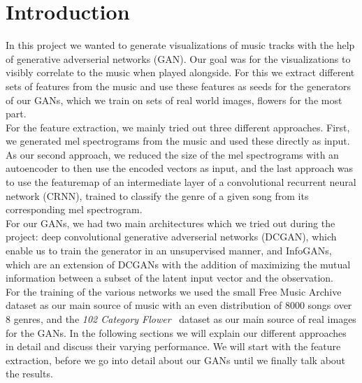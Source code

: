 \chapter{Introduction}
  In this project we wanted to generate visualizations of music tracks with the help of generative adverserial networks (GAN). 
  Our goal was for the visualizations to visibly correlate to the music when played alongside.
  For this we extract different sets of features from the music and use these features as seeds for the generators of our GANs, which we train on sets of real world images, flowers for the most part.\\
  For the feature extraction, we mainly tried out three different approaches. First, we generated mel spectrograms from the music and used these directly as input. 
  As our second approach, we reduced the size of the mel spectrograms with an autoencoder to then use the encoded vectors as input, and the last approach was to use the featuremap of an intermediate layer of a convolutional recurrent neural network (CRNN), trained to classify the genre of a given song from its corresponding mel spectrogram.\\
  For our GANs, we had two main architectures which we tried out during the project: deep convolutional generative adverserial networks (DCGAN), which enable us to train the generator in an unsupervised manner, and InfoGANs, which are an extension of DCGANs with the addition of maximizing
  the mutual information between a subset of the latent input vector and the observation.\\
  For the training of the various networks we used the small Free Music Archive~\cite{FMA} dataset as our main source of music with an even distribution of 8000 songs over 8 genres, and the \textit{102 Category Flower}~\cite{102flower} dataset as our main source of real images for the GANs.
  In the following sections we will explain our different approaches in detail and discuss their varying performance. We will start with the feature extraction, before we go into detail about our GANs until we finally talk about the results.